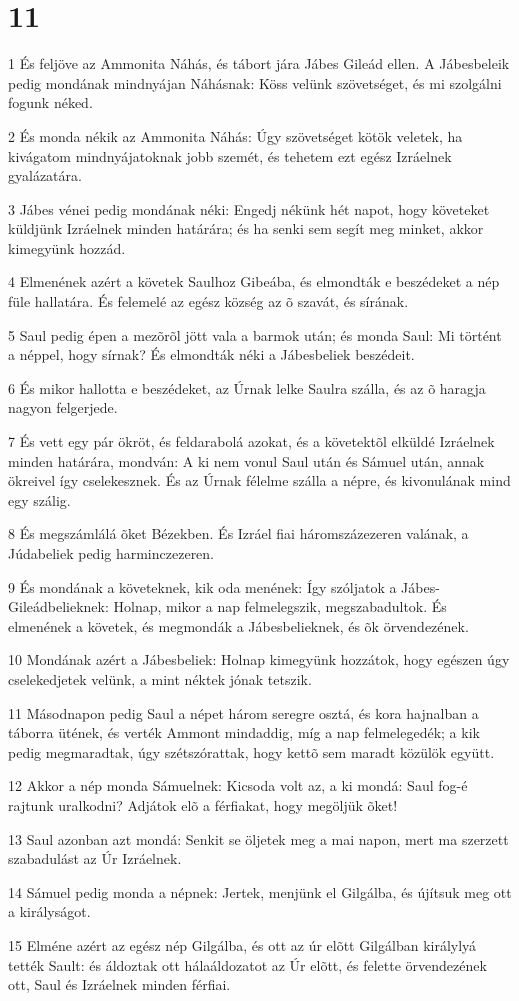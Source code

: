 \chapter{11}

\par 1 És feljöve az Ammonita Náhás, és tábort jára Jábes Gileád ellen. A Jábesbeleik pedig mondának mindnyájan Náhásnak: Köss velünk szövetséget, és mi szolgálni fogunk néked.
\par 2 És monda nékik az Ammonita Náhás: Úgy szövetséget kötök veletek, ha kivágatom mindnyájatoknak jobb szemét, és tehetem ezt egész Izráelnek gyalázatára.
\par 3 Jábes vénei pedig mondának néki: Engedj nékünk hét napot, hogy követeket küldjünk Izráelnek minden határára; és ha senki sem segít meg minket, akkor kimegyünk hozzád.
\par 4 Elmenének azért a követek Saulhoz Gibeába, és elmondták e beszédeket a nép füle hallatára. És felemelé az egész község az õ szavát, és sírának.
\par 5 Saul pedig épen a mezõrõl jött vala a barmok után; és monda Saul: Mi történt a néppel, hogy sírnak? És elmondták néki a Jábesbeliek beszédeit.
\par 6 És mikor hallotta e beszédeket, az Úrnak lelke Saulra szálla, és az õ haragja nagyon felgerjede.
\par 7 És vett egy pár ökröt, és feldarabolá azokat, és a követektõl elküldé Izráelnek minden határára, mondván: A ki nem vonul Saul után és Sámuel után, annak ökreivel így cselekesznek. És az Úrnak félelme szálla a népre, és kivonulának mind egy szálig.
\par 8 És megszámlálá õket Bézekben. És Izráel fiai háromszázezeren valának, a Júdabeliek pedig harminczezeren.
\par 9 És mondának a követeknek, kik oda menének: Így szóljatok a Jábes-Gileádbelieknek: Holnap, mikor a nap felmelegszik, megszabadultok. És elmenének a követek, és megmondák a Jábesbelieknek, és õk örvendezének.
\par 10 Mondának azért a Jábesbeliek: Holnap kimegyünk hozzátok, hogy egészen úgy cselekedjetek velünk, a mint néktek jónak tetszik.
\par 11 Másodnapon pedig Saul a népet három seregre osztá, és kora hajnalban a táborra ütének, és verték Ammont mindaddig, míg a nap felmelegedék; a kik pedig megmaradtak, úgy szétszórattak, hogy kettõ sem maradt közülök együtt.
\par 12 Akkor a nép monda Sámuelnek: Kicsoda volt az, a ki mondá: Saul fog-é rajtunk uralkodni? Adjátok elõ a férfiakat, hogy megöljük õket!
\par 13 Saul azonban azt mondá: Senkit se öljetek meg a mai napon, mert ma szerzett szabadulást az Úr Izráelnek.
\par 14 Sámuel pedig monda a népnek: Jertek, menjünk el Gilgálba, és újítsuk meg ott a királyságot.
\par 15 Elméne azért az egész nép Gilgálba, és ott az úr elõtt Gilgálban királylyá tették Sault: és áldoztak ott hálaáldozatot az Úr elõtt, és felette örvendezének ott, Saul és Izráelnek minden férfiai.

